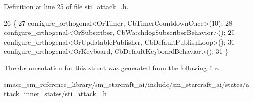 Definition at line 25 of file sti\+\_\+attack\+\_.\+h.


\begin{DoxyCode}
26   \{
27     configure\_orthogonal<OrTimer, CbTimerCountdownOnce>(10);
28     configure\_orthogonal<OrSubscriber, CbWatchdogSubscriberBehavior>();
29     configure\_orthogonal<OrUpdatablePublisher, CbDefaultPublishLoop>();
30     configure\_orthogonal<OrKeyboard, CbDefaultKeyboardBehavior>();
31   \}
\end{DoxyCode}


The documentation for this struct was generated from the following file\+:\begin{DoxyCompactItemize}
\item 
smacc\+\_\+sm\+\_\+reference\+\_\+library/sm\+\_\+starcraft\+\_\+ai/include/sm\+\_\+starcraft\+\_\+ai/states/attack\+\_\+inner\+\_\+states/\hyperlink{sti__attack__2_8h}{sti\+\_\+attack\+\_.\+h}\end{DoxyCompactItemize}
